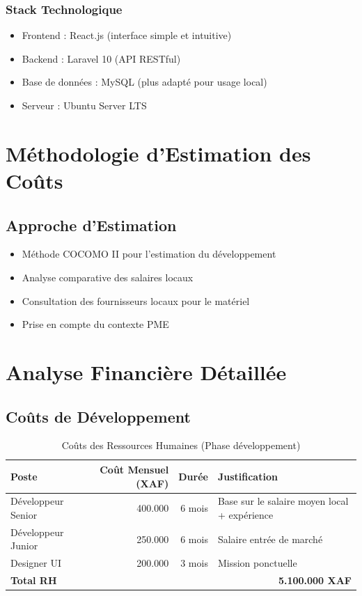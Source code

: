 \documentclass[14pt,a4paper]{report}
\begin{document}
\subsection{Stack Technologique}
\begin{itemize}
    \item Frontend : React.js (interface simple et intuitive)
    \item Backend : Laravel 10 (API RESTful)
    \item Base de données : MySQL (plus adapté pour usage local)
    \item Serveur : Ubuntu Server LTS
\end{itemize}

\chapter{Méthodologie d'Estimation des Coûts}

\section{Approche d'Estimation}
\begin{itemize}
    \item Méthode COCOMO II pour l'estimation du développement
    \item Analyse comparative des salaires locaux
    \item Consultation des fournisseurs locaux pour le matériel
    \item Prise en compte du contexte PME
\end{itemize}

\chapter{Analyse Financière Détaillée}

\section{Coûts de Développement}
\begin{table}[h]
    \centering
    \begin{tabular}{|l|r|r|p{4cm}|}
        \hline
        \textbf{Poste} & \textbf{Coût Mensuel (XAF)} & \textbf{Durée} & \textbf{Justification} \\
        \hline
        Développeur Senior & 400.000 & 6 mois & Base sur le salaire moyen local + expérience \\
        \hline
        Développeur Junior & 250.000 & 6 mois & Salaire entrée de marché \\
        \hline
        Designer UI & 200.000 & 3 mois & Mission ponctuelle \\
        \hline
        \textbf{Total RH} & \multicolumn{3}{r|}{\textbf{5.100.000 XAF}} \\
        \hline
    \end{tabular}
    \caption{Coûts des Ressources Humaines (Phase développement)}
\end{table}
\end{document}
